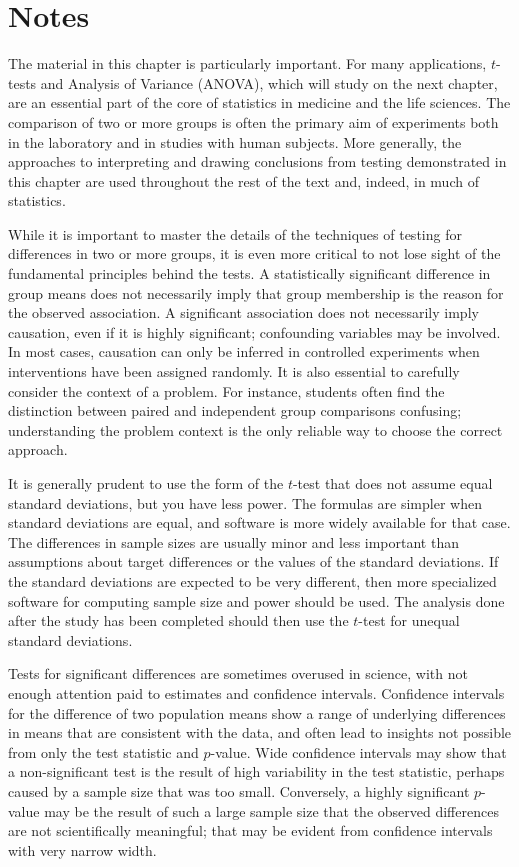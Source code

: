 
\section{Notes}
\label{inferenceForNumericalDataNotes}


The material in this chapter is particularly important.  For many applications, $t$-tests and Analysis of Variance (ANOVA), which will study on the next chapter, are an essential part of the core of statistics in medicine and the life sciences.  The comparison of two or more groups is often the primary aim of experiments both in the laboratory and in studies with human subjects. More generally, the approaches to interpreting and drawing conclusions from testing demonstrated in this chapter are used throughout the rest of the text and, indeed, in much of statistics.  

While it is important to master the details of the techniques of testing for differences in two or more groups, it is even more critical to not lose sight of the fundamental principles behind the tests.  A statistically significant difference in group means does not necessarily imply that group membership is the reason for the observed association. A significant association does not necessarily imply causation, even if it is highly significant; confounding variables may be involved. In most cases, causation can only be inferred in controlled experiments when interventions have been assigned randomly. It is also essential to carefully consider the context of a problem. For instance, students often find the distinction between paired and independent group comparisons confusing; understanding the problem context is the only reliable way to choose the correct approach.

It is generally prudent to use the form of the $t$-test that does not assume equal standard deviations, but you have less power.  The formulas are simpler when standard deviations are equal, and software is more widely available for that case.  The differences in sample sizes are usually minor and less important than assumptions about target differences or the values of the standard deviations.  If the standard deviations are expected to be very different, then more specialized software for computing sample size and power should be used. The analysis done after the study has been completed should then use the $t$-test for unequal standard deviations.

Tests for significant differences are sometimes overused in science, with not enough attention paid to estimates and confidence intervals.  Confidence intervals for the difference of two population means show a range of underlying differences in means that are consistent with the data, and often lead to insights not possible from only the test statistic and $p$-value.  Wide confidence intervals may show that a non-significant test is the result of high variability in the test statistic, perhaps caused by a sample size that was too small.  Conversely, a highly significant $p$-value may be the result of such a large sample size that the observed differences are not scientifically meaningful; that may be evident from confidence intervals with very narrow width.

